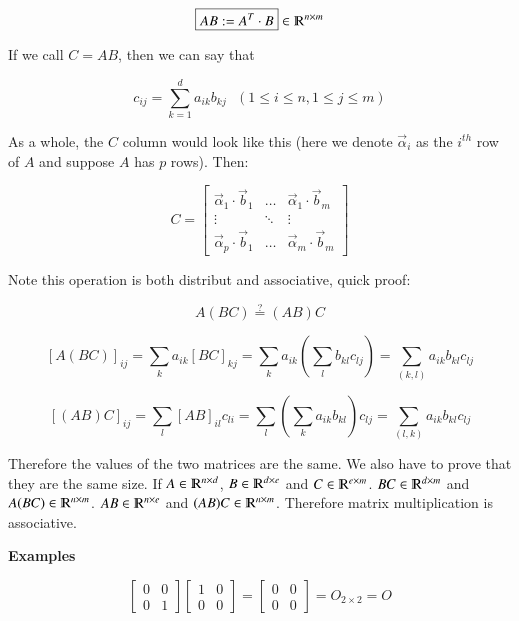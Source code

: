 \documentclass [12 pt, twoside] {book}
\newcommand\+{\text{ }}
\begin{document}
$$\boxed{AB := A^T \cdot B} \in \varmathbb{R}^{n\times m}$$

If we call $C = AB$, then we can say that

$$c_{ij} = \sum_{k = 1}^d a_{ik} b_{kj} \text{  } (1 \leq i \leq n, 1 \leq j
\leq m)$$

As a whole, the $C$ column would look like this (here we denote $\vec{\alpha}_i$
as the $i^{th}$ row of $A$ and suppose $A$ has $p$ rows). Then:

\[
    C = \left[\begin{array}{ccc}
        \vec{\alpha}_1 \cdot \vec{b}_1 & \dots & \vec{\alpha}_1 \cdot
        \vec{b}_m\\
        \vdots & \ddots & \vdots\\
        \vec{\alpha}_p \cdot \vec{b}_1 & \dots & \vec{\alpha}_m \cdot
        \vec{b}_m
    \end{array}\right]
\]

Note this operation is both distribut and associative, quick proof:

$$A (BC) \overset{?}{=} (AB) C$$

$$[A(BC)]_{ij} = \sum_{k} a_{ik} [BC]_{kj} = \sum_k a_{ik} (\sum_l b_{kl} c_{lj})
= \sum_{(k, l)} a_{ik} b_{kl} c_{lj}$$

$$[(AB)C]_{ij} = \sum_l [AB]_{il} c_{li} = \sum_l(\sum_k a_{ik} b_{kl})c_{lj} =
\sum_{(l, k)} a_{ik} b_{kl} c_{lj}$$

Therefore the values of the two matrices are the same. We also have to prove
that they are the same size. If $A \in \varmathbb{R}^{n \times d}$, $B \in
\varmathbb{R}^{d \times e}$ and $C \in \varmathbb{R}^{e \times m}$. $BC \in
\varmathbb{R}^{d \times m}$ and $A(BC) \in \varmathbb{R}^{n \times m}$. $AB \in
\varmathbb{R}^{n \times e}$ and $(AB)C \in \varmathbb{R}^{n \times m}$.
Therefore matrix multiplication is associative.

\textbf{Examples}

\[
    \left[\begin{array}{cc}
        0 & 0 \\
        0 & 1
    \end{array}\right]
    \left[\begin{array}{cc}
        1 & 0 \\
        0 & 0
    \end{array}\right]
    =
    \left[\begin{array}{cc}
        0 & 0 \\
        0 & 0
    \end{array}\right]
    = O_{2 \times 2}
    = O
\]
\end{document}

